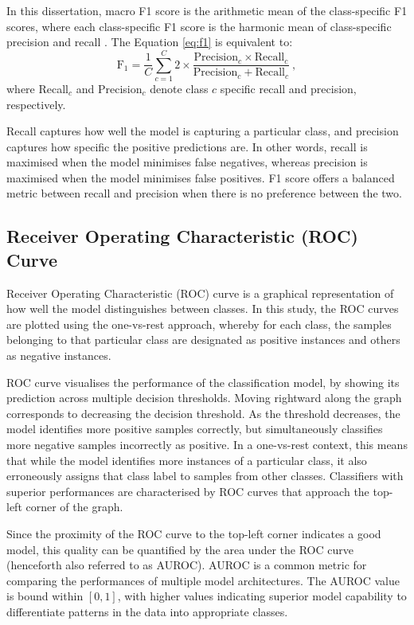 \documentclass{l4proj}
\begin{document}
In this dissertation, macro F1 score is the arithmetic mean of the class-specific F1 scores, where each class-specific F1 score is the harmonic mean of class-specific precision and recall \citep{opitz2021}. The Equation \ref{eq:f1} is equivalent to:
\begin{equation}
    \text{F}_1 = \frac{1}{C}\sum_{c=1}^{C}2 \times \frac{\text{Precision}_c \times \text{Recall}_c}{\text{Precision}_c + \text{Recall}_c}\ ,
\end{equation}
where Recall$_c$ and Precision$_c$ denote class $c$ specific recall and precision, respectively.

Recall captures how well the model is capturing a particular class, and precision captures how specific the positive predictions are. In other words, recall is maximised when the model minimises false negatives, whereas precision is maximised when the model minimises false positives. F1 score offers a balanced metric between recall and precision when there is no preference between the two.


\subsection{Receiver Operating Characteristic (ROC) Curve}
Receiver Operating Characteristic (ROC) curve is a graphical representation of how well the model distinguishes between classes. In this study, the ROC curves are plotted using the one-vs-rest approach, whereby for each class, the samples belonging to that particular class are designated as positive instances and others as negative instances.

ROC curve visualises the performance of the classification model, by showing its prediction across multiple decision thresholds. Moving rightward along the graph corresponds to decreasing the decision threshold. As the threshold decreases, the model identifies more positive samples correctly, but simultaneously classifies more negative samples incorrectly as positive. In a one-vs-rest context, this means that while the model identifies more instances of a particular class, it also erroneously assigns that class label to samples from other classes. Classifiers with superior performances are characterised by ROC curves that approach the top-left corner of the graph.

Since the proximity of the ROC curve to the top-left corner indicates a good model, this quality can be quantified by the area under the ROC curve (henceforth also referred to as AUROC). AUROC is a common metric for comparing the performances of multiple model architectures. The AUROC value is bound within $[0, 1]$, with higher values indicating superior model capability to differentiate patterns in the data into appropriate classes.
\end{document}
